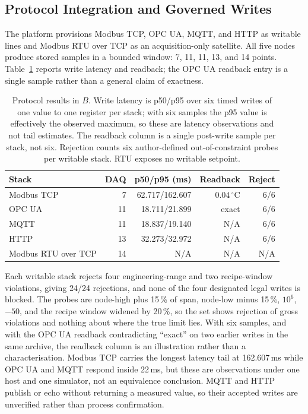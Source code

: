 \subsection{Protocol Integration and Governed Writes}
\label{sec:port}
\label{sec:dynamic}
\label{sec:plc}
\label{sec:govsurface}
The platform provisions Modbus TCP, OPC UA, MQTT, and HTTP as writable lines and
Modbus RTU over TCP as an acquisition-only satellite. All five nodes produce stored
samples in a bounded window: 7, 11, 11, 13, and 14 points. Table~\ref{tab:plc} reports write latency and readback; the OPC UA readback entry is a single sample rather than a general claim of exactness.

\begin{table}[!t]
\centering
\caption{Protocol results in $B$. Write latency is p50/p95 over six timed writes
of one value to one register per stack; with six samples the p95 value is
effectively the observed maximum, so these are latency observations and not tail
estimates. The readback column is a single post-write sample per stack, not six.
Rejection counts six author-defined out-of-constraint probes per writable stack.
RTU exposes no writable setpoint.}
\label{tab:plc}
\scriptsize
\setlength{\tabcolsep}{3.4pt}
\begin{tabular}{@{}lrrrr@{}}
\toprule
Stack & DAQ & p50/p95 (ms) & Readback & Reject \\
\midrule
Modbus TCP & 7 & 62.717/162.607 & $0.04\,^\circ$C & 6/6 \\
OPC UA & 11 & 18.711/21.899 & exact & 6/6 \\
MQTT & 11 & 18.837/19.140 & N/A & 6/6 \\
HTTP & 13 & 32.273/32.972 & N/A & 6/6 \\
Modbus RTU over TCP & 14 & N/A & N/A & N/A \\
\bottomrule
\end{tabular}
\end{table}

Each writable stack rejects four engineering-range and two recipe-window
violations, giving 24/24 rejections, and none of the four designated legal writes is blocked.
The probes are node-high plus 15\,\% of span, node-low minus 15\,\%,
$10^{6}$, $-50$, and the recipe window widened by 20\,\%, so the set shows rejection
of gross violations and nothing about where the true limit lies. With six samples,
and with the OPC UA readback contradicting ``exact'' on two earlier writes in the
same archive, the readback column is an illustration rather than a characterisation.
Modbus TCP carries the longest latency tail at 162.607\,ms while OPC UA and MQTT
respond inside 22\,ms, but these are observations under one host and one simulator,
not an equivalence conclusion. MQTT and HTTP publish or echo without returning a
measured value, so their accepted writes are unverified rather than process
confirmation.

